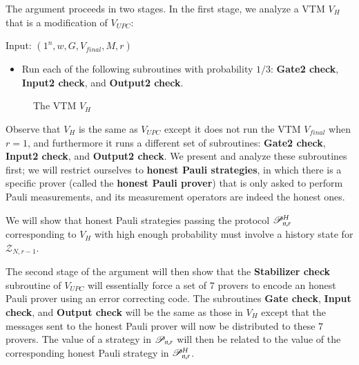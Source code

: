 The argument proceeds in two stages. In the first stage, we analyze a VTM $V_H$ that is a modification of $V_{UPC}$: 

\begin{center}
\begin{mdframed}
    Input: $(1^n,w,G,V_{final},M,r)$
    \begin{itemize}
    	\item Run each of the following subroutines with probability $1/3$: \textbf{Gate2 check}, \textbf{Input2 check}, and \textbf{Output2 check}.
		\end{itemize}
\end{mdframed}

\begin{figure}[H]
\caption{The VTM $V_H$}
\label{fig:vtm_h}
\end{figure}
\end{center}

Observe that $V_H$ is the same as $V_{UPC}$ except it does not run the VTM $V_{final}$ when $r = 1$, and furthermore it runs a different set of subroutines: \textbf{Gate2 check}, \textbf{Input2 check}, and \textbf{Output2 check}. We present and analyze these subroutines first; we will restrict ourselves to \textbf{honest Pauli strategies}, in which there is a specific prover (called the \textbf{honest Pauli prover}) that is only asked to perform Pauli measurements, and its measurement operators are indeed the honest ones.

We will show that honest Pauli strategies passing the protocol $\mathscr{P}^H_{n,r}$ corresponding to $V_H$ with high enough probability must involve a history state for $\mathscr{Z}_{N,r-1}$.

The second stage of the argument will then show that the \textbf{Stabilizer check} subroutine of $V_{UPC}$ will essentially force a set of $7$ provers to encode an honest Pauli prover using an error correcting code. The subroutines \textbf{Gate check}, \textbf{Input check}, and \textbf{Output check} will be the same as those in $V_H$ except that the messages sent to the honest Pauli prover will now be distributed to these $7$ provers. The value of a strategy in $\mathscr{P}_{n,r}$ will then be related to the value of the corresponding honest Pauli strategy in $\mathscr{P}^H_{n,r}$.


